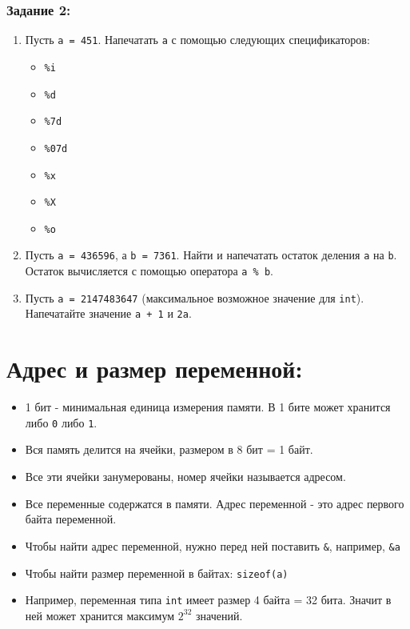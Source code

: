 \documentclass{article}
\begin{document}
\subsubsection*{Задание 2:}
\begin{enumerate}
\item Пусть \texttt{a = 451}. Напечатать \texttt{a} с помощью следующих спецификаторов:
\begin{multicols}{3}
	\begin{itemize}
	\item \texttt{\%i}
	\item \texttt{\%d}
	\item \texttt{\%7d}
	\item \texttt{\%07d}
	\item \texttt{\%x}
	\item \texttt{\%X}
	\item \texttt{\%o}
	\end{itemize}
\end{multicols}
\item Пусть \texttt{a = 436596}, а \texttt{b = 7361}. Найти и напечатать остаток деления \texttt{a} на \texttt{b}. Остаток вычисляется с помощью оператора \texttt{a \% b}.
\item Пусть \texttt{a = 2147483647} (максимальное возможное значение для \texttt{int}). Напечатайте значение \texttt{a + 1} и \texttt{2a}.

\end{enumerate}

\section*{Адрес и размер переменной:}
\begin{itemize}
\item 1 бит - минимальная единица измерения памяти. В 1 бите может хранится либо \texttt{0} либо \texttt{1}.
\item Вся память делится на ячейки, размером в 8 бит = 1 байт.
\item Все эти ячейки занумерованы, номер ячейки называется адресом.
\item Все переменные содержатся в памяти. Адрес переменной - это адрес первого байта переменной.
\item Чтобы найти адрес переменной, нужно перед ней поставить \texttt{\&}, например, \texttt{\&a}
\item Чтобы найти размер переменной в байтах: \texttt{sizeof(a)}
\item Например, переменная типа \texttt{int} имеет размер 4 байта = 32 бита. Значит в ней может хранится максимум $2^{32}$ значений.
\end{itemize}
\end{document}
